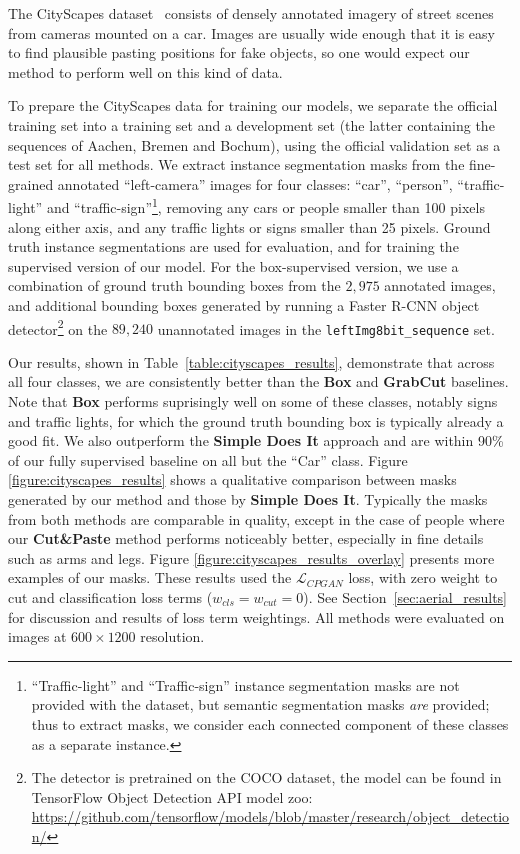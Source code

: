 \documentclass[runningheads]{llncs}
\begin{document}
The CityScapes dataset~\cite{Cordts2016Cityscapes} 
consists of densely annotated imagery of
street scenes from cameras mounted on a car. Images are usually wide enough that it is easy to find plausible pasting positions for fake objects, so one would expect our method to perform well on this kind of data.

To prepare the CityScapes data for training our models,
we separate the official training set into a training set and a development set (the latter containing the sequences of Aachen, Bremen and Bochum), using
the official validation set as a test set for all methods. 
We extract instance segmentation masks from the fine-grained annotated ``left-camera'' images for four classes: 
``car'', ``person'', ``traffic-light'' and ``traffic-sign''\footnote{``Traffic-light'' and ``Traffic-sign'' instance segmentation masks are not provided with the dataset, but semantic segmentation masks \emph{are} provided; thus to extract masks, we consider each connected component of these classes as a separate instance.},
removing any
cars or people smaller than 100 pixels along either axis, 
and any traffic lights or signs smaller than 25 pixels. 
Ground truth instance segmentations are used for evaluation, and for training the supervised version of our model. For the box-supervised version, we use a combination of ground truth bounding boxes from the $2,975$ annotated images, and additional bounding boxes generated by running a Faster R-CNN object detector\footnote{The detector is pretrained on the COCO dataset, the model can be found in TensorFlow Object Detection API model zoo:
\url{https://github.com/tensorflow/models/blob/master/research/object_detection/}}
on the $89,240$ unannotated images in the \texttt{leftImg8bit\_sequence} set.


Our results, shown in Table~\ref{table:cityscapes_results}, demonstrate that
across all four classes, we are consistently better than the {\bf Box}
and  {\bf GrabCut} baselines. Note that {\bf Box} performs suprisingly well on some of these classes, notably signs and traffic lights, for which the ground truth bounding box is typically already a good fit. We also outperform the {\bf Simple Does It} approach and are within 90\% of our fully supervised baseline on all but the ``Car'' class.
Figure \ref{figure:cityscapes_results} shows a qualitative comparison between
masks generated by our method and those by {\bf Simple Does It}. Typically the masks from both methods are comparable in quality, except in the case of people where our {\bf Cut\&Paste} method performs noticeably better, especially in fine details such as arms and legs. 
Figure \ref{figure:cityscapes_results_overlay} presents more examples of our masks.
These results used the $\mathcal{L}_{CPGAN}$ loss, with zero weight to cut and classification loss terms ($w_{cls}=w_{cut}=0$). See Section~\ref{sec:aerial_results} for discussion and results of loss term weightings. All methods were evaluated on images at $600\times 1200$ resolution.
\end{document}
